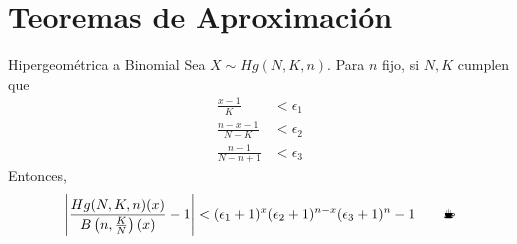 \documentclass{beamer}
\begin{document}
\section{Teoremas de Aproximación}
\begin{frame}{Hipergeométrica a Binomial}
  Sea $X\sim Hg(N,K,n)$. Para $n$ fijo, si $N,K$ cumplen que
  \begin{align*}
    \frac{x-1}{K}         &< \epsilon_1\\
    \frac{n-x-1}{N-K}     &< \epsilon_2\\
    \frac{n-1}{N - n + 1} &< \epsilon_3
  \end{align*}
  Entonces,
  \[
    \left|\dfrac{Hg(N,K,n)(x)}{B\left(n,\frac{K}{N}\right)(x)} - 1\right| 
    < (\epsilon_1 + 1)^{x}(\epsilon_2 + 1)^{n-x}(\epsilon_3 + 1)^{n} - 1
    \qquad\text{\Coffeecup}
  \]
\end{frame}
\end{document}
